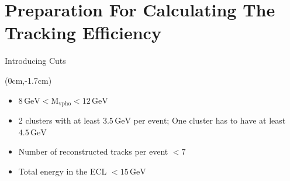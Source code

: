 \documentclass[8pt]{beamer}
\begin{document}
\section{Preparation For Calculating The Tracking Efficiency}





\begin{frame}{Introducing Cuts}
	\begin{textblock*}{11cm}(0cm,-1.7cm)
	\begin{itemize}
		\item<3-> $8\,\textrm{GeV} < \textrm{M}_{\textrm{vpho}} < 12\,\textrm{GeV}$
		\item<3-> 2 clusters with at least $3.5\,\textrm{GeV}$ per event; One cluster has to have at least $4.5\,\textrm{GeV}$
		\item<3-> Number of reconstructed tracks per event $< 7$
		\item<3-> Total energy in the ECL $< 15\,\textrm{GeV}$
	\end{itemize}

\end{textblock*}


\end{frame}
\end{document}
